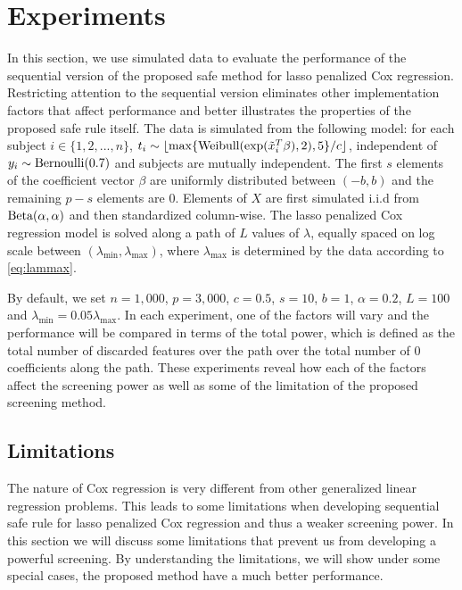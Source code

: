 \section{Experiments}

In this section, we use simulated data to evaluate the performance of the sequential version of the proposed safe method for lasso penalized Cox regression. Restricting attention to the sequential version eliminates other implementation factors that affect performance and better illustrates the properties of the proposed safe rule itself. The data is simulated from the following model: for each subject $i\in\{1,2,...,n\}$, $t_i \sim \lfloor\max\{\textnormal{Weibull}(\exp(\tilde{x}_i^T \beta),2), 5\}/c\rfloor $, independent of $y_i \sim \textnormal{Bernoulli}(0.7)$ and subjects are mutually independent. The first $s$ elements of the coefficient vector $\beta$ are uniformly distributed between $(-b,b)$ and the remaining $p-s$ elements are $0$. Elements of $X$ are first simulated i.i.d from $\textnormal{Beta}(\alpha,\alpha)$ and then standardized column-wise. The lasso penalized Cox regression model is solved along a path of $L$ values of $\lambda$, equally spaced on log scale between $(\lambda_{\min},\lambda_{\max})$, where $\lambda_{\max}$ is determined by the data according to \eqref{eq:lammax}. 

By default, we set $n=1,000$, $p=3,000$, $c=0.5$, $s=10$, $b=1$, $\alpha=0.2$, $L=100$ and $\lambda_{\min}=0.05\lambda_{\max}$. In each experiment, one of the factors will vary and the performance will be compared in terms of the total power, which is defined as the total number of discarded features over the path over the total number of 0 coefficients along the path.  These experiments reveal how each of the factors affect the screening power as well as some of the limitation of the proposed screening method.

\subsection{Limitations}
\label{sec:lim}


The nature of Cox regression is very different from other generalized linear regression problems. This leads to some limitations when developing sequential safe rule for lasso penalized Cox regression and thus a weaker screening power. In this section we will discuss some limitations that prevent us from developing a powerful screening. By understanding the limitations, we will show under some special cases, the proposed method have a much better performance.


